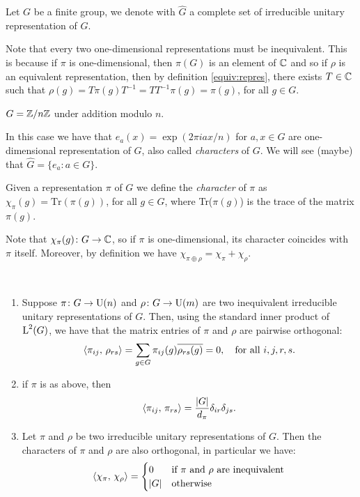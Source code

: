 \begin{defn}
Let $G$ be a finite group, we denote with $\hat{G}$ a complete set of irreducible unitary representation of $G$.
\end{defn}
\begin{rem}
Note that every two one-dimensional representations must be inequivalent. This is because if $\pi$ is one-dimensional, then $\pi(G)$ is an element of ${\mathbb C}$ and so if $\rho$ is an equivalent representation, then by definition \ref{equiv:repres}, there exists $T\in {\mathbb C}$ such that $\rho(g)=T\pi(g) T^{-1} = TT^{-1}\pi(g)=\pi(g)$, for all $g\in G$.
\end{rem}
\begin{exmp}
\label{exa:characters}
$G={\mathbb Z}/n{\mathbb Z}$ under addition modulo $n$.

In this case we have that $e_a(x)=\exp(2\pi iax/n)$ for $a,x\in G$ are one-dimensional representation of $G$, also called \emph{characters} of $G$. We will see (maybe) that $\hat{G}=\{e_a\colon a \in G\}$. 
\end{exmp}
\begin{defn}
Given a representation $\pi$ of $G$ we define the \emph{character} of $\pi$ as $\chi_\pi(g)=\text{Tr}(\pi(g))$, for all $g \in G$, where Tr($\pi(g)$) is the trace of the matrix $\pi(g)$.
\end{defn}
\begin{rem}
Note that $\chi_\pi(g)\colon G\rightarrow {\mathbb C}$, so if $\pi$ is one-dimensional, its character coincides with $\pi$ itself. Moreover, by definition we have $\chi_{\pi\oplus\rho}=\chi_{\pi} + \chi_\rho$.
\end{rem}
\begin{theorem}~ 
\label{thm:schurel}
\begin{enumerate}
\item Suppose $\pi\colon G\rightarrow \operatorname{U}(n)$ and $\rho\colon G\rightarrow \operatorname{U}(m)$ are two inequivalent irreducible unitary representations of $G$. Then, using the standard inner product of $\operatorname{L}^2(G)$, we have that the matrix entries of $\pi$ and $\rho$ are pairwise orthogonal:
\[
\braket{\pi_{ij},\, \rho_{rs}}=\sum_{g\in G}\pi_{ij}(g)\overline{\rho_{rs}(g)}=0, \quad \text{for all $i,j,r,s.$}
\]
\item if $\pi$ is as above, then 
\[
\braket{\pi_{ij},\, \pi_{rs}}=\frac{\lvert G\rvert}{d_\pi}\delta_{ir}\delta_{js}.
\]
\item Let $\pi$ and $\rho$ be two irreducible unitary representations of $G$. Then the characters of $\pi$ and $\rho$ are also orthogonal, in particular we have:
\[
\braket{\chi_\pi,\, \chi_\rho}=
\begin{cases}
0 &\text{if $\pi$ and $\rho$ are inequivalent} \\
\lvert G\rvert &\text{otherwise}
\end{cases}
\]
\end{enumerate}
\end{theorem}
